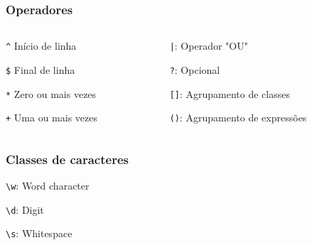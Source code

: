 \begin{frame}[fragile]\frametitle{Operadores}
  \begin{columns}
    \begin{column}{0.5\textwidth}
      \begin{widedescription}
        \item \verb|^| Início de linha
        \item \verb|$| Final de linha
        \item \verb|*| Zero ou mais vezes
        \item \verb|+| Uma ou mais vezes
      \end{widedescription}
    \end{column}
    \begin{column}{0.5\textwidth}
      \begin{widedescription}
        \item \verb$|$: Operador "OU"
        \item \verb$?$: Opcional
        \item \verb$[]$: Agrupamento de classes
        \item \verb$()$: Agrupamento de expressões
      \end{widedescription}
    \end{column}
  \end{columns}
\end{frame}

\begin{frame}[fragile]\frametitle{Classes de caracteres}
  \begin{widedescription}
    \item \verb$\w$: Word character
    \item \verb$\d$: Digit
    \item \verb$\s$: Whitespace
  \end{widedescription}
\end{frame}

